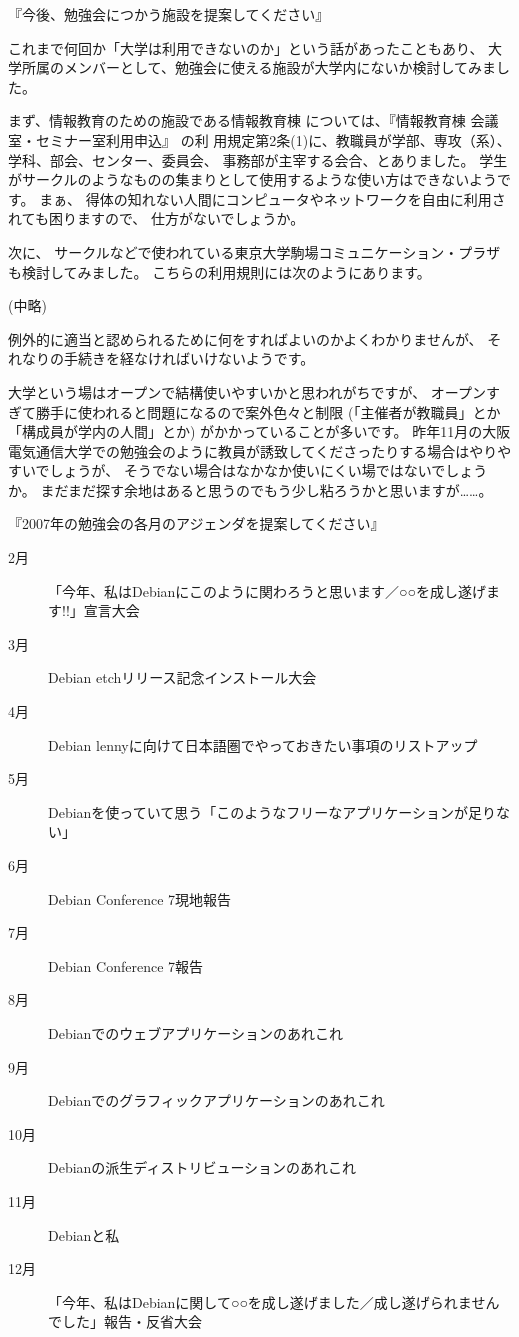 \documentclass[cjk,dvipdfmx]{beamer}
\begin{document}
\begin{frame}{『今後、勉強会につかう施設を提案してください』}

\tiny

これまで何回か「大学は利用できないのか」という話があったこともあり、
大学所属のメンバーとして、勉強会に使える施設が大学内にないか検討してみました。

まず、情報教育のための施設である情報教育棟
については、『情報教育棟 
会議室・セミナー室利用申込』
の利
用規定第2条(1)に、教職員が学部、専攻（系）、学科、部会、センター、委員会、
事務部が主宰する会合、とありました。
学生がサークルのようなものの集まりとして使用するような使い方はできないようです。
まぁ、
得体の知れない人間にコンピュータやネットワークを自由に利用されても困りますので、
仕方がないでしょうか。

次に、
サークルなどで使われている東京大学駒場コミュニケーション・プラザも検討してみました。
こちらの利用規則には次のようにあります。

(中略)

例外的に適当と認められるために何をすればよいのかよくわかりませんが、
それなりの手続きを経なければいけないようです。

大学という場はオープンで結構使いやすいかと思われがちですが、
オープンすぎて勝手に使われると問題になるので案外色々と制限 (「主催者が教職員」とか「構成員が学内の人間」とか) がかかっていることが多いです。
昨年11月の大阪電気通信大学での勉強会のように教員が誘致してくださったりする場合はやりやすいでしょうが、
そうでない場合はなかなか使いにくい場ではないでしょうか。
まだまだ探す余地はあると思うのでもう少し粘ろうかと思いますが……。
\end{frame}

\begin{frame}{『2007年の勉強会の各月のアジェンダを提案してください』}

{\tiny
\begin{description}
 \item[2月] 「今年、私はDebianにこのように関わろうと思います／○○を成し遂げます!!」宣言大会
 \item[3月] Debian etchリリース記念インストール大会
 \item[4月] Debian lennyに向けて日本語圏でやっておきたい事項のリストアップ
 \item[5月] Debianを使っていて思う「このようなフリーなアプリケーションが足りない」
 \item[6月] Debian Conference 7現地報告
 \item[7月] Debian Conference 7報告
 \item[8月] Debianでのウェブアプリケーションのあれこれ
 \item[9月] Debianでのグラフィックアプリケーションのあれこれ
 \item[10月] Debianの派生ディストリビューションのあれこれ
 \item[11月] Debianと私
 \item[12月] 「今年、私はDebianに関して○○を成し遂げました／成し遂げられませんでした」報告・反省大会
\end{description}
}
\end{frame}
\end{document}
